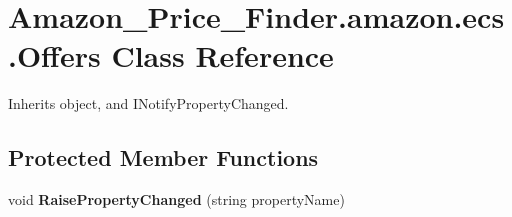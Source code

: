 \hypertarget{class_amazon___price___finder_1_1amazon_1_1ecs_1_1_offers}{\section{Amazon\-\_\-\-Price\-\_\-\-Finder.\-amazon.\-ecs.\-Offers Class Reference}
\label{class_amazon___price___finder_1_1amazon_1_1ecs_1_1_offers}
}


 




Inherits object, and I\-Notify\-Property\-Changed.

\subsection*{Protected Member Functions}
\begin{DoxyCompactItemize}
\item 
\hypertarget{class_amazon___price___finder_1_1amazon_1_1ecs_1_1_offers_ad61eb7776aab8db1c53ea30cba8fe0b1}{void {\bfseries Raise\-Property\-Changed} (string property\-Name)}\label{class_amazon___price___finder_1_1amazon_1_1ecs_1_1_offers_ad61eb7776aab8db1c53ea30cba8fe0b1}

\end{DoxyCompactItemize}
